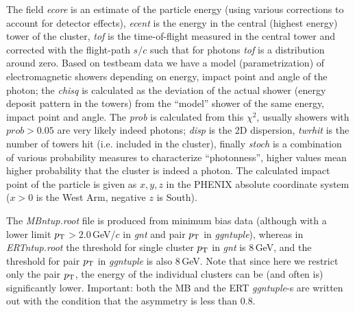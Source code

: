 \documentclass[pdftex,12pt,letter]{article}
\newcommand{\pt}{\mbox{$p_{\rm T}$}\xspace}
\newcommand{\gev}{\mbox{GeV}\xspace}
\newcommand{\gevc}{\mbox{GeV/$c$}\xspace}
\begin{document}
The field {\it ecore} is an estimate of the particle energy (using various
corrections to account for detector effects), {\it ecent} is the
energy in the central (highest energy) tower of the cluster, 
{\it tof} is the time-of-flight measured in the central tower and
corrected with the flight-path $s/c$ such that for photons {\it tof}
is a distribution around zero.  Based on testbeam data we have a model
(parametrization) of electromagnetic showers depending on energy, impact
point and angle of the photon; the {\it chisq} is calculated as the
deviation of the actual shower (energy deposit pattern in the towers)
from the ``model'' shower of the same energy, impact point and angle.
The {\it prob} is calculated from this $\chi^2$, usually showers with
$prob>0.05$ are very likely indeed photons;  {\it disp} is the 2D
dispersion, {\it twrhit} is the number of towers hit (i.e. included in
the cluster), finally {\it stoch} is a combination of various
probability measures to characterize ``photonness'', higher values
mean higher probability that the cluster is indeed a photon.  The
calculated impact point of the particle is given as $x,y,z$ in the
PHENIX absolute coordinate system ($x>0$ is the West Arm, negative $z$
is South).

The {\it MBntup.root} file is produced from minimum bias data (although
with a lower limit  \pt$>2.0$\,\gevc in {\it gnt} and pair \pt in
{\it ggntuple}), whereas in {\it ERTntup.root} the threshold for 
single cluster \pt in {\it gnt} is 8\,\gev, and the threshold for pair
\pt in {\it ggntuple} is also 8\,\gev.  Note that since here we
restrict only the pair \pt, the energy of the individual clusters can
be (and often is) significantly lower.  Important: both the MB and the
ERT {\it ggntuple}-s are written out with the condition that the
asymmetry is less than 0.8.
\end{document}
